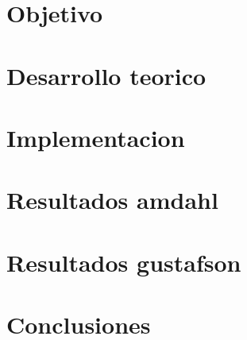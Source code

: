 


		
	
	\newpage
	\tableofcontents
	\newpage

	\graphicspath{{../docs/report/pics/}}

	\section{Objetivo}
		

	\newpage
	\section{Desarrollo teorico}
		

	\newpage
	\section{Implementacion}
		

	\newpage
	\section{Resultados amdahl}
		

	\newpage
	\section{Resultados gustafson}
		

	\newpage
	\section{Conclusiones}
		

